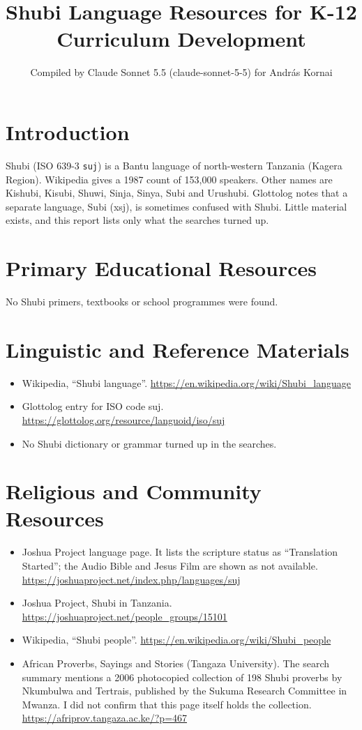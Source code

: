 \documentclass[12pt]{article}
\title{Shubi Language Resources for K-12 Curriculum Development}
\author{Compiled by Claude Sonnet 5.5 (claude-sonnet-5-5) for Andr\'as Kornai}
\date{}
\begin{document}
\maketitle

\section{Introduction}
Shubi (ISO 639-3 \texttt{suj}) is a Bantu language of north-western Tanzania (Kagera Region). Wikipedia gives a 1987 count of 153,000 speakers. Other names are Kishubi, Kisubi, Shuwi, Sinja, Sinya, Subi and Urushubi. Glottolog notes that a separate language, Subi (xsj), is sometimes confused with Shubi. Little material exists, and this report lists only what the searches turned up.

\section{Primary Educational Resources}
No Shubi primers, textbooks or school programmes were found.

\section{Linguistic and Reference Materials}
\begin{itemize}
\item Wikipedia, ``Shubi language''. \url{https://en.wikipedia.org/wiki/Shubi_language}
\item Glottolog entry for ISO code suj. \url{https://glottolog.org/resource/languoid/iso/suj}
\item No Shubi dictionary or grammar turned up in the searches.
\end{itemize}

\section{Religious and Community Resources}
\begin{itemize}
\item Joshua Project language page. It lists the scripture status as ``Translation Started''; the Audio Bible and Jesus Film are shown as not available. \url{https://joshuaproject.net/index.php/languages/suj}
\item Joshua Project, Shubi in Tanzania. \url{https://joshuaproject.net/people_groups/15101}
\item Wikipedia, ``Shubi people''. \url{https://en.wikipedia.org/wiki/Shubi_people}
\item African Proverbs, Sayings and Stories (Tangaza University). The search summary mentions a 2006 photocopied collection of 198 Shubi proverbs by Nkumbulwa and Tertrais, published by the Sukuma Research Committee in Mwanza. I did not confirm that this page itself holds the collection. \url{https://afriprov.tangaza.ac.ke/?p=467}
\end{itemize}
\end{document}
